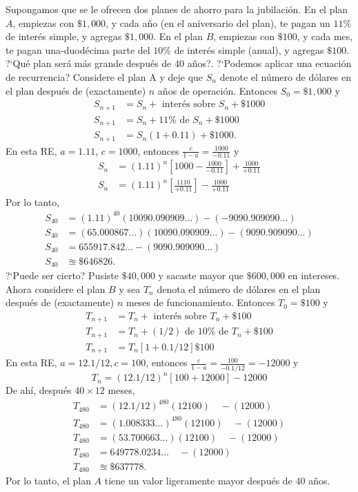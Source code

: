 Supongamos que se le ofrecen dos planes de ahorro para la jubilación. En el plan $A$, empiezas con $\$1,000$, y cada año (en el aniversario del plan), te pagan un $11\%$ de interés simple, y agregas $\$1,000$. En el plan $B$, empiezas con $\$100$, y cada mes, te pagan una-duodécima parte del $10\%$ de interés simple (anual), y agregas $\$100$. ?`Qué plan será más grande después de $40$ años?. ?`Podemos aplicar una ecuación de recurrencia? Considere el plan A y deje que $S_{n}$ denote el número de dólares en el plan después de (exactamente) $n$ años de operación. Entonces $S_{0}=\$1,000$ y
\begin{align*}
	S_{n+1}&= S_{n}+\text{ interés sobre }S_n+\$1000\\
	S_{n+1}&=S_{n}+11\%\text{ de }S_n+\$1000\\
	S_{n+1}&=S_{n}(1+0.11)+\$1000.
\end{align*}
En esta RE, $a=1.11$, $c=1000$, entonces $\tfrac{c}{1-a}=\tfrac{1000}{-0.11}$ y
\begin{align*}
	S_{n}&={\left(1.11\right)}^{n}\left[1000-\frac{1000}{-0.11}\right]+\frac{1000}{+0.11}\\
	S_{n}&={\left(1.11\right)}^{n}\left[\frac{1110}{+0.11}\right]-\frac{1000}{+0.11}
\end{align*}
Por lo tanto,
\begin{align*}
	S_{40}&={\left(1.11\right)}^{40}(10090.090909\ldots)-(-9090.909090\ldots)\\
	S_{40}&=(65.000867\ldots)(10090.090909\ldots)-(9090.909090\ldots)\\
	S_{40}&=655917.842\ldots-(9090.909090\ldots)\\
	S_{40}&\approxeq\$646826.
\end{align*}
?`Puede ser cierto? Pusiste $\$40,000$ y sacaste mayor que $\$600,000$ en intereses. Ahora considere el plan $B$ y sea $T_{n}$ denota el número de dólares en el plan después de (exactamente) $n$ meses de funcionamiento. Entonces $T_{0}=\$100$ y
\begin{align*}
	T_{n+1}&=T_{n}+\text{ interés sobre }T_{n}+\$100\\
	T_{n+1}&= T_{n}+(1/2)\text{ de }10\%\text{ de }T_{n}+\$100\\
	T_{n+1}&=T_{n}\left[1+0.1/12\right]\$100
\end{align*}
En esta RE, $a=12.1/12,c=100$, entonces $\tfrac{c}{1-a}=\tfrac{100}{-0.1/12}=-12000$ y
\begin{equation*}
	T_{n}={\left(12.1/12\right)}^{n}\left[100+12000\right]-12000
\end{equation*}
De ahí, después $40\times12$ meses,
\begin{align*}
	T_{480}&={\left(12.1/12\right)}^{480}(12100)\quad-(12000)\\
	T_{480}&={\left(1.008333\ldots\right)}^{480}(12100)\quad-(12000)\\
	T_{480}&=\left(53.700663\ldots\right)(12100)\quad-(12000)\\
	T_{480}&=649778.0234\ldots\quad-(12000)\\
	T_{480}&\approxeq\$637778.
\end{align*}
Por lo tanto, el plan $A$ tiene un valor ligeramente mayor después de $40$ años.

